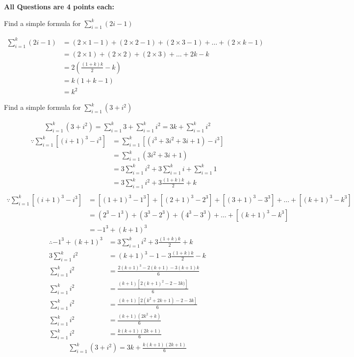 \documentclass[12pt]{article}
\newenvironment{sol}[1][Solution]{\begin{trivlist}
\item[\hskip\labelsep {\bfseries #1:}]}{\end{trivlist}}
\begin{document}
\textbf{All Questions are 4 points each:}\\
\begin{enumerate}
    \item Find a simple formula for $\sum_{i=1}^k(2i-1)$
    \begin{sol}
        \begin{align*}
    \sum_{i=1}^k(2i-1) & = (2 \times 1 -1) + (2 \times 2-1)+(2 \times 3 -1) + \dots + (2 \times k -1)\\
    & = (2 \times 1) + (2 \times 2) + (2 \times 3) + \dots + 2k  - k\\
    & = 2(\frac{(1+k)k}{2}-k) \\
    & = k(1+k-1) \\
    & = k^2
\end{align*}
    \end{sol}

    \item Find a simple formula for $\sum_{i=1}^k(3+i^2)$
    \begin{sol}
        \begin{align*}
        \sum_{i=1}^k(3+i^2) = \sum_{i=1}^k3 +\sum_{i=1}^k i^2= 3k + \sum_{i = 1}^k i^2 
        \end{align*}
        \begin{align*}
        \because \sum_{i=1}^k[(i+1)^3 - i^3] &= \sum_{i=1}^k[(i^3+3i^2+3i+1)-i^3] \\
        &= \sum_{i=1}^k(3i^2 + 3i +1) \\
        &= 3\sum_{i=1}^ki^2 + 3\sum_{i=1}^ki + \sum_{i=1}^k 1 \\
        &= 3 \sum_{i=1}^ki^2 + 3\frac{(1+k)k}{2}+k\\
        \end{align*}
        \begin{align*}
            \because \sum_{i=1}^k[(i+1)^3 - i^3] &=[(1+1)^3-1^3]+[(2+1)^3-2^3]+[(3+1)^3-3^3]+\dots+[(k+1)^3 - k^3] \\
            & = (2^3 -1^3) +(3^3-2^3)+(4^3-3^3)+\dots+[(k+1)^3 - k^3]\\
            & = -1^3+(k+1)^3 
        \end{align*}
        \begin{align*}
            \therefore -1^3+(k+1)^3 &= 3 \sum_{i=1}^ki^2 + 3\frac{(1+k)k}{2}+k \\
            3\sum_{i=1}^ki^2&=(k+1)^3-1-3\frac{(1+k)k}{2}-k \\
            \sum_{i=1}^ki^2& = \frac{2(k+1)^3-2(k+1)-3(k+1)k}{6}\\
            \sum_{i=1}^ki^2&= \frac{(k+1)[2(k+1)^2-2-3k)]}{6}\\
            \sum_{i=1}^ki^2&= \frac{(k+1)[2(k^2+2k+1)-2-3k]}{6}\\
            \sum_{i=1}^ki^2&= \frac{(k+1)(2k^2+k)}{6}\\
            \sum_{i=1}^ki^2&= \frac{k(k+1)(2k+1)}{6}
        \end{align*}
        \begin{align*}
             \sum_{i=1}^k(3+i^2) = 3k+\frac{k(k+1)(2k+1)}{6}
        \end{align*}
    \end{sol}


\end{enumerate}
\end{document}
